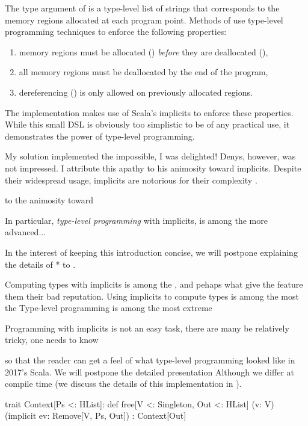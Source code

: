 \memImplicitMainCodeSection

\noindent
The type argument of  is a type-level list of strings that corresponds to the memory regions allocated at each program point.
Methods of  use type-level programming techniques to enforce the following properties:

\begin{enumerate}
  \item memory regions must be allocated () \emph{before} they are deallocated (),
  \item all memory regions must be deallocated by the end of the program,
  \item dereferencing () is only allowed on previously allocated regions.
\end{enumerate}

\noindent
The implementation makes use of Scala's implicits to enforce these properties.
While this small DSL is obviously too simplistic to be of any practical use, it demonstrates the power of type-level programming.

My solution implemented the impossible, I was delighted!
Denys, however, was not impressed.
I attribute this apathy to his animosity toward implicits.
Despite their widespread usage, implicits are notorious for their complexity \citep{filip2019implicits}.

to the animosity toward

In particular, \emph{type-level programming} with implicits, is among the more advanced...

In the interest of keeping this introduction concise, we will postpone explaining the details of * to .

Computing types with implicits is among the , and pehaps what give the feature them their bad reputation.
Using implicits to compute types is among the most the
Type-level programming is among the most extreme

Programming with implicits is not an easy task, there are many
be relatively tricky, one needs to know

so that the reader can get a feel of what type-level programming looked like in 2017's Scala.
We will postpone the detailed presentation
Although we differ
at compile time (we discuss the details of this implementation in ).

\memImplicitContextCodeSection
trait Context[Ps <: HList]:
  def free[V <: Singleton, Out <: HList]
    (v: V)
    (implicit ev: Remove[V, Ps, Out])
    : Context[Out]

